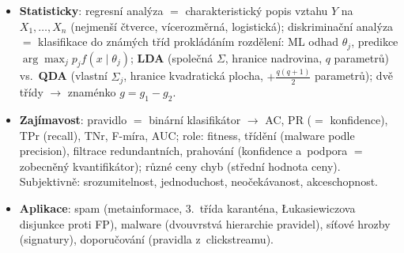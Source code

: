 \documentclass[11pt,a4paper]{article}
\theoremstyle{definition}
\begin{document}
\begin{itemize}
 zobecněným kvantifikátorem nad čtyřpolní tabulkou $(a,b,c,d)$; (1)~odhady
 pravděpodobností --- asociační pravidla, $\frac{a}{a+b}\ge c_0$ (konfidence)
 $\wedge$ $\frac{a}{n}\ge s_0$ (podpora); (2)~testy hypotéz --- jednostranný
 Fisherův test zamítá nezávislost ve prospěch pozitivní závislosti.
\item \textbf{Statisticky}: regresní analýza $=$ charakteristický popis vztahu $Y$ na
 $X_1,\dots,X_n$ (nejmenší čtverce, vícerozměrná, logistická); diskriminační
 analýza $=$ klasifikace do známých tříd prokládáním rozdělení: ML odhad
 $\theta_j$, predikce $\arg\max_j p_j f(x\mid\theta_j)$; \textbf{LDA} (společná
 $\Sigma$, hranice nadrovina, $q$ parametrů) vs.\ \textbf{QDA} (vlastní $\Sigma_j$,
 hranice kvadratická plocha, $+\frac{q(q+1)}{2}$ parametrů); dvě třídy $\to$
 znaménko $g=g_1-g_2$.
\item \textbf{Zajímavost}: pravidlo $=$ binární klasifikátor $\to$ AC, PR
 ($=$ konfidence), TPr (recall), TNr, F-míra, AUC; role: fitness, třídění
 (malware podle precision), filtrace redundantních, prahování (konfidence
 a~podpora $=$ zobecněný kvantifikátor); různé ceny chyb (střední hodnota ceny).
 Subjektivně: srozumitelnost, jednoduchost, neočekávanost, akceschopnost.
\item \textbf{Aplikace}: spam (metainformace, 3.~třída karanténa, Łukasiewiczova
 disjunkce proti FP), malware (dvouvrstvá hierarchie pravidel), síťové hrozby
 (signatury), doporučování (pravidla z~clickstreamu).
\end{itemize}
\end{document}
